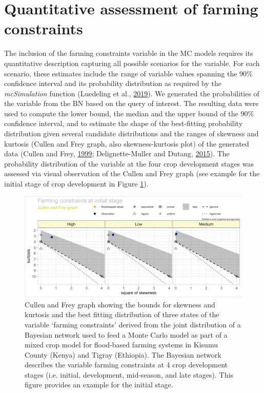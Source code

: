 \documentclass[]{elsarticle} %
\begin{document}
\hypertarget{refs3}{%
\section{Quantitative assessment of farming constraints}\label{refs3}}

The inclusion of the farming constraints variable in the MC models requires its quantitative description capturing all possible scenarios for the variable. For each scenario, these estimates include the range of variable values spanning the 90\% confidence interval and its probability distribution as required by the \emph{mcSimulation} function (Luedeling et al., \protect\hyperlink{ref-Luedeling_Goehring_et_al_2019}{2019}). We generated the probabilities of the variable from the BN based on the query of interest. The resulting data were used to compute the lower bound, the median and the upper bound of the 90\% confidence interval, and to estimate the shape of the best-fitting probability distribution given several candidate distributions and the ranges of skewness and kurtosis (Cullen and Frey graph, also skewness-kurtosis plot) of the generated data (Cullen and Frey, \protect\hyperlink{ref-Cullen_and_Frey_1999}{1999}; Delignette-Muller and Dutang, \protect\hyperlink{ref-Delignette-Muller_and_Dutang_2015}{2015}). The probability distribution of the variable at the four crop development stages was assessed via visual observation of the Cullen and Frey graph (see example for the initial stage of crop development in Figure \ref{fig:fig7}).

\begin{figure}[!h]

{\centering \includegraphics[width=1\linewidth,]{figures/figure_s7} 

}

\caption{Cullen and Frey graph showing the bounds for skewness and kurtosis and the best fitting distribution of three states of the variable ‘farming constraints’ derived from the joint distribution of a Bayesian network used to feed a Monte Carlo model as part of a mixed crop model for flood-based farming systems in Kisumu County (Kenya) and Tigray (Ethiopia). The Bayesian network describes the variable farming constraints at 4 crop development stages (i.e. initial, development, mid-season, and late stages). This figure provides an example for the initial stage.}\label{fig:fig7}
\end{figure}
\end{document}
